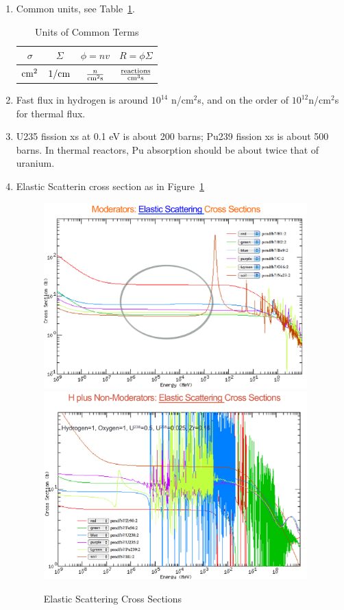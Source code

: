 \documentclass{school-22.211-notes}
\begin{document}
\begin{enumerate}
\item Common units, see Table~\ref{units}.
\begin{table}
  \centering
  \begin{tabular}{|c|c|c|c|} \hline
   $\sigma$ & $\Sigma$ & $\phi = nv$ & $R = \phi \Sigma$  \\ \hline
   $\mathrm{cm}^2$ & $1/\mathrm{cm}$ & $\frac{n}{\mathrm{cm}^2 \mathrm{s}}$ & $\frac{\mathrm{reactions}}{\mathrm{cm}^3 \mathrm{s}}$ \\ \hline
  \end{tabular}
  \caption{Units of Common Terms} \label{units}
\end{table}

\item Fast flux in hydrogen is around $10^{14}$ n/cm$^2$s, and on the order of $10^{12}$n/cm$^2$s for thermal flux. 

\item U235 fission xs at 0.1 eV is about 200 barns; Pu239 fission xs is about 500 barns. In thermal reactors, Pu absorption should be about twice that of uranium. 

\item Elastic Scatterin cross section as in Figure~\ref{scatter-xs}
\begin{figure}
  \centering
  \includegraphics[width=4in]{images/scatter-xs-moderator.png}
  \\
  \includegraphics[width=4in]{images/scatter-xs-LWR.png}
  \caption{Elastic Scattering Cross Sections} \label{scatter-xs}
\end{figure}


\end{enumerate}
\end{document}
